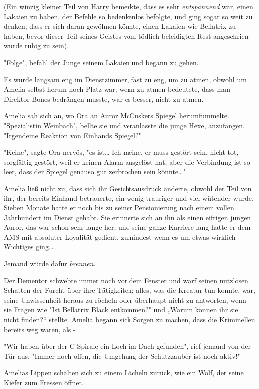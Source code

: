 {(Ein winzig kleiner Teil von Harry bemerkte, dass es sehr \emph{entspannend} war, einen Lakaien zu haben, der Befehle so bedenkenlos befolgte, und ging sogar so weit zu denken, dass er sich daran gewöhnen könnte, einen Lakaien wie Bellatrix zu haben, bevor dieser Teil seines Geistes vom tödlich beleidigten Rest angeschrien wurde ruhig zu sein).

"Folge", befahl der Junge seinem Lakaien und begann zu gehen.

Es wurde langsam eng im Dienstzimmer, fast zu eng, um zu atmen, obwohl um Amelia selbst herum noch Platz war; wenn zu atmen bedeutete, dass man Direktor Bones bedrängen musste, war es besser, nicht zu atmen.

Amelia sah sich an, wo Ora an Auror McCuskers Spiegel herumfummelte. "Spezialistin Weinbach", bellte sie und veranlasste die junge Hexe, anzufangen. "Irgendeine Reaktion von Einhands Spiegel?"

"Keine", sagte Ora nervös, "es ist… Ich meine, er muss gestört sein, nicht tot, sorgfältig gestört, weil er keinen Alarm ausgelöst hat, aber die Verbindung ist so leer, dass der Spiegel genauso gut zerbrochen sein könnte…"

Amelia ließ nicht zu, dass sich ihr Gesichtsausdruck änderte, obwohl der Teil von ihr, der bereits Einhand betrauerte, ein wenig trauriger und viel wütender wurde. Sieben Monate hatte er noch bis zu seiner Pensionierung nach einem vollen Jahrhundert im Dienst gehabt. Sie erinnerte sich an ihn als einen eifrigen jungen Auror, das war schon sehr lange her, und seine ganze Karriere lang hatte er dem AMS mit absoluter Loyalität gedient, zumindest wenn es um etwas wirklich Wichtiges ging…

Jemand würde dafür \emph{brennen}.

Der Dementor schwebte immer noch vor dem Fenster und warf seinen nutzlosen Schatten der Furcht über ihre Tätigkeiten; alles, was die Kreatur tun konnte, war, seine Unwissenheit heraus zu röcheln oder überhaupt nicht zu antworten, wenn sie Fragen wie "Ist Bellatrix Black entkommen?" und „Warum können ihr sie nicht finden?“ stellte. Amelia begann sich Sorgen zu machen, dass die Kriminellen bereits weg waren, als -

"Wir haben über der C-Spirale ein Loch im Dach gefunden", rief jemand von der Tür aus. "Immer noch offen, die Umgehung der Schutzzauber ist noch aktiv!"

Amelias Lippen schälten sich zu einem Lächeln zurück, wie ein Wolf, der seine Kiefer zum Fressen öffnet.

}
